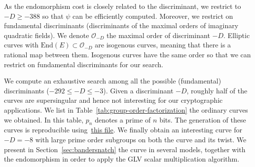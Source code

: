 \documentclass{article}
\newcommand{\End}{\ensuremath{\text{End}}}
\theoremstyle{definition}
\begin{document}
As the endomorphism cost is closely related to the discriminant, we
restrict to $-D \geq -388$ so that $\psi$ can be efficiently computed.
Moreover, we restrict on fundamental discriminants (discriminants
of the maximal orders of imaginary quadratic fields). We denote
$\mathcal O_{-D}$ the maximal order of discriminant $-D$. Elliptic
curves with $\End(E) \subset \mathcal O_{-D}$ are isogenous curves,
meaning that there is a rational map between them. Isogenous curves
have the same order so that we can restrict on fundamental
discriminants for our search.

We compute an exhaustive search among all the possible (fundamental)
discriminants ($-292 \leq -D \leq -3$).
Given a discriminant $-D$, roughly half of the curves are
supersingular and hence not interesting for our cryptographic
applications.
We list in Table~\ref{tab:group-order-factorization} the ordinary
curves we obtained. In this table, $p_n$ denotes a prime of $n$ bits.
The generation of these curves is reproducible
using~\href{https://github.com/asanso/Bandersnatch/blob/main/code/small-disc-curves.py}{this
  file}.
We finally obtain an interesting curve for $-D = -8$ with large prime
order subgroups on both the curve and its twist.
We present in Section~\ref{sec:bandersnatch} the curve in several
models, together with the endomorphism in order to apply the GLV
scalar multiplication algorithm.
\end{document}
